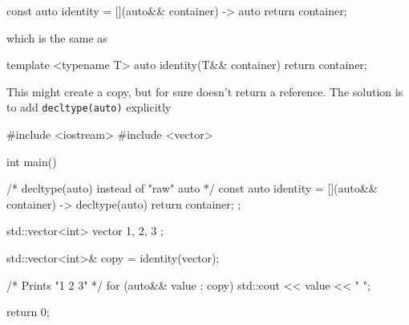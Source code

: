 \documentclass[../main]{subfiles}
\begin{document}
\begin{Code}
const auto identity = [](auto&& container) -> auto
{
    return container;
}
\end{Code}
\noindent
which is the same as
\begin{Code}
template <typename T>
auto identity(T&& container)
{
    return container;
}
\end{Code}
\noindent
This might create a copy, but for sure doesn't return a reference. The solution is to add \texttt{decltype(auto)} explicitly
\begin{Code}
    #include <iostream>
    #include <vector>
    
    int main()
    {
        /* decltype(auto) instead of "raw" auto */
        const auto identity = [](auto&& container) -> decltype(auto)
        {
            return container;
        };
        
        std::vector<int> vector { 1, 2, 3 };
        
        std::vector<int>& copy = identity(vector);
        
        /* Prints "1 2 3" */
        for (auto&& value : copy)
        {
            std::cout << value << " ";
        }
        
        return 0;
    }
\end{Code}
\end{document}
